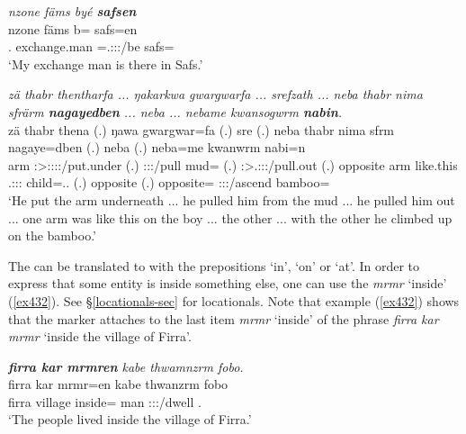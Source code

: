\begin{exe}
	\ex \emph{nzone fäms byé \textbf{safsen}}\\
	\gll nzone fäms b= safs=en\\
	\Fsg.{\Poss} {exchange.man} \Med=\Tsg.\Masc:\Sbj:\Nonpast:\Ipfv/be safs={\Loc}\\
	\trans `My exchange man is there in Safs.'
	\label{ex431}
\end{exe}
\begin{exe}
	\ex \emph{zä thabr thentharfa ... ŋakarkwa gwargwarfa ... srefzath ... neba thabr nima sfrärm \textbf{nagayedben} ... neba ... nebame kwansogwrm \textbf{nabin}.}\\
	\gll zä thabr thena (.) ŋawa gwargwar=fa (.) sre (.) neba thabr nima sfrm nagaye=dben (.) neba (.) neba=me kwanwrm nabi=n\\
	{\Prox} arm \Stsg:\Sbj>\Stpl:\Obj:\Pst:\Pfv:\Venit/put.under (.) \Stsg:\Sbj:\Pst:\Ipfv/pull mud={\Abl} (.) \Stsg:\Sbj>\Tsg.\Masc:\Obj:\Irr:\Pfv/pull.out (.) opposite arm {like.this} \Tsg.\Masc:\Sbj:\Pst:\Dur{} child=\Loc.\Anim.{\Sg} (.) opposite (.) opposite={\Ins} \Stsg:\Sbj:\Pst:\Dur/ascend bamboo={\Loc}\\
	\trans `He put the arm underneath ... he pulled him from the mud ... he pulled him out ... one arm was like this on the boy ... the other ... with the other he climbed up on the bamboo.'
	\label{ex430}
\end{exe}

The  can be translated to  with the prepositions `in', `on' or `at'. In order to express that some entity is inside something else, one can use the   \emph{mrmr} `inside' (\ref{ex432}). See {\S}\ref{locationals-sec} for locationals. Note that example (\ref{ex432}) shows that the  marker attaches to the last item \emph{mrmr} `inside' of the phrase \emph{firra kar mrmr} `inside the village of Firra'.
	
\begin{exe}
	\ex \emph{\textbf{firra kar mrmren} kabe thwamnzrm fobo.}\\
	\gll firra kar mrmr=en kabe thwanzrm fobo\\
	firra village inside={\Loc} man \Stpl:\Sbj:\Pst:\Dur/dwell \Dist.{\All}\\
	\trans `The people lived inside the village of Firra.'
	\label{ex432}
\end{exe}

